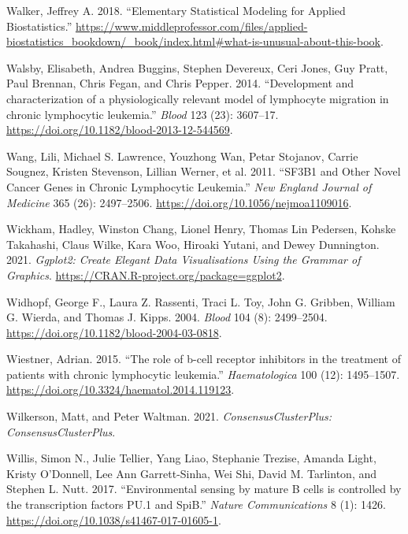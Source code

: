 \documentclass[11pt, a4paper, twosided]{book}
\newenvironment{CSLReferences}%
  {}%
  {\par}
\begin{document}
\begin{CSLReferences}{1}{0}
\leavevmode{}%
Walker, Jeffrey A. 2018. {``{Elementary Statistical Modeling for Applied Biostatistics}.''} \url{https://www.middleprofessor.com/files/applied-biostatistics_bookdown/_book/index.html\#what-is-unusual-about-this-book}.

\leavevmode{}%
Walsby, Elisabeth, Andrea Buggins, Stephen Devereux, Ceri Jones, Guy Pratt, Paul Brennan, Chris Fegan, and Chris Pepper. 2014. {``{Development and characterization of a physiologically relevant model of lymphocyte migration in chronic lymphocytic leukemia}.''} \emph{Blood} 123 (23): 3607--17. \url{https://doi.org/10.1182/blood-2013-12-544569}.

\leavevmode{}%
Wang, Lili, Michael S. Lawrence, Youzhong Wan, Petar Stojanov, Carrie Sougnez, Kristen Stevenson, Lillian Werner, et al. 2011. {``{SF3B1 and Other Novel Cancer Genes in Chronic Lymphocytic Leukemia}.''} \emph{New England Journal of Medicine} 365 (26): 2497--2506. \url{https://doi.org/10.1056/nejmoa1109016}.

\leavevmode{}%
Wickham, Hadley, Winston Chang, Lionel Henry, Thomas Lin Pedersen, Kohske Takahashi, Claus Wilke, Kara Woo, Hiroaki Yutani, and Dewey Dunnington. 2021. \emph{Ggplot2: Create Elegant Data Visualisations Using the Grammar of Graphics}. \url{https://CRAN.R-project.org/package=ggplot2}.

\leavevmode{}%
Widhopf, George F., Laura Z. Rassenti, Traci L. Toy, John G. Gribben, William G. Wierda, and Thomas J. Kipps. 2004. \emph{Blood} 104 (8): 2499--2504. \url{https://doi.org/10.1182/blood-2004-03-0818}.

\leavevmode{}%
Wiestner, Adrian. 2015. {``{The role of b-cell receptor inhibitors in the treatment of patients with chronic lymphocytic leukemia}.''} \emph{Haematologica} 100 (12): 1495--1507. \url{https://doi.org/10.3324/haematol.2014.119123}.

\leavevmode{}%
Wilkerson, Matt, and Peter Waltman. 2021. \emph{ConsensusClusterPlus: ConsensusClusterPlus}.

\leavevmode{}%
Willis, Simon N., Julie Tellier, Yang Liao, Stephanie Trezise, Amanda Light, Kristy O'Donnell, Lee Ann Garrett-Sinha, Wei Shi, David M. Tarlinton, and Stephen L. Nutt. 2017. {``{Environmental sensing by mature B cells is controlled by the transcription factors PU.1 and SpiB}.''} \emph{Nature Communications} 8 (1): 1426. \url{https://doi.org/10.1038/s41467-017-01605-1}.


\end{CSLReferences}
\end{document}
